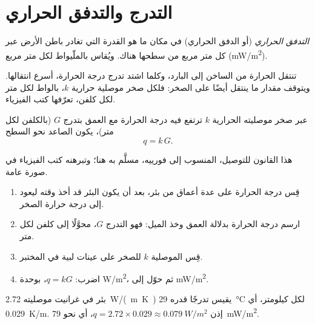 \section{التدرج والتدفق الحراري}

\begin{definition}\label{def:g12:internal-heat:heat-flow}
\emph{التدفق الحراري} (أو الدفق الحراري) في مكان ما هو
القدرة التي تغادر باطن الأرض عبر كل متر مربع من سطحها
هناك. ويُقاس بالملّيواط لكل متر مربع
(\unit{mW/m^2}).
\end{definition}

تنتقل الحرارة من الساخن إلى البارد، وكلما اشتد تدرج درجة الحرارة،
أسرع انتقالها. ويتوقف مقدار ما ينتقل أيضًا على الصخر: فلكل صخر
موصلية حرارية $k$، بالواط لكل متر لكل كلفن، تعرّفها كتب
الفيزياء.

\begin{proposition}\label{prop:g12:internal-heat:fourier}
عبر صخر موصليته الحرارية $k$ ترتفع فيه درجة الحرارة مع
العمق بتدرج $G$ (بالكلفن لكل متر)، يكون  الصاعد نحو
السطح
\[
  q = k\,G .
\]
\end{proposition}

هذا القانون للتوصيل، المنسوب إلى فورييه، مسلَّم به هنا؛ وتبرهنه كتب الفيزياء
في صورة عامة.

\begin{method}\label{met:g12:internal-heat:borehole}
\begin{enumerate}
  \item قِس درجة الحرارة على عدة أعماق من بئر، بعد أن يكون
        البئر قد أخذ وقته ليعود إلى درجة حرارة الصخر.
  \item ارسم درجة الحرارة بدلالة العمق وخذ الميل: فهو التدرج $G$،
        محوَّلًا إلى كلفن لكل متر.
  \item قِس الموصلية $k$ للصخر على عينات لبية في
        المختبر.
  \item اضرب: $q = kG$، بوحدة \unit{W/m^2}، ثم حوّل إلى \unit{mW/m^2}.
\end{enumerate}
\end{method}

\begin{example}\label{ex:g12:internal-heat:borehole}
بئر في غرانيت موصليته \qty{2.72}{W/(m.K)} يقيس
تدرجًا قدره \qty{29}{\celsius} لكل كيلومتر، أي \qty{0.029}{K/m}.
إذن $q = 2.72 \times 0.029 \approx \qty{0.079}{W/m^2}$، أي نحو
\qty{79}{mW/m^2}.
\end{example}

